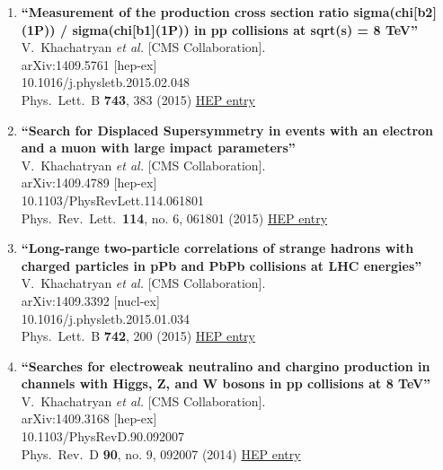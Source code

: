 \documentclass{article}
\begin{document}
\begin{enumerate}
\item%
{\bf ``Measurement of the production cross section ratio sigma(chi[b2](1P)) / sigma(chi[b1](1P)) in pp collisions at sqrt(s) = 8 TeV''}
  \\{}V.~Khachatryan {\it et al.} [CMS Collaboration].
  \\{}arXiv:1409.5761 [hep-ex]
    \\{}10.1016/j.physletb.2015.02.048
\\{}Phys.\ Lett.\ B {\bf 743}, 383 (2015) %
\href{http://inspirehep.net/record/1318344}{HEP entry}


\item%
{\bf ``Search for Displaced Supersymmetry in events with an electron and a muon with large impact parameters''}
  \\{}V.~Khachatryan {\it et al.} [CMS Collaboration].
  \\{}arXiv:1409.4789 [hep-ex]
    \\{}10.1103/PhysRevLett.114.061801
\\{}Phys.\ Rev.\ Lett.\  {\bf 114}, no. 6, 061801 (2015) %
\href{http://inspirehep.net/record/1317640}{HEP entry}


\item%
{\bf ``Long-range two-particle correlations of strange hadrons with charged particles in pPb and PbPb collisions at LHC energies''}
  \\{}V.~Khachatryan {\it et al.} [CMS Collaboration].
  \\{}arXiv:1409.3392 [nucl-ex]
    \\{}10.1016/j.physletb.2015.01.034
\\{}Phys.\ Lett.\ B {\bf 742}, 200 (2015) %
\href{http://inspirehep.net/record/1315947}{HEP entry}


\item%
{\bf ``Searches for electroweak neutralino and chargino production in channels with Higgs, Z, and W bosons in pp collisions at 8 TeV''}
  \\{}V.~Khachatryan {\it et al.} [CMS Collaboration].
  \\{}arXiv:1409.3168 [hep-ex]
    \\{}10.1103/PhysRevD.90.092007
\\{}Phys.\ Rev.\ D {\bf 90}, no. 9, 092007 (2014) %
\href{http://inspirehep.net/record/1315820}{HEP entry}



\end{enumerate}
\end{document}
